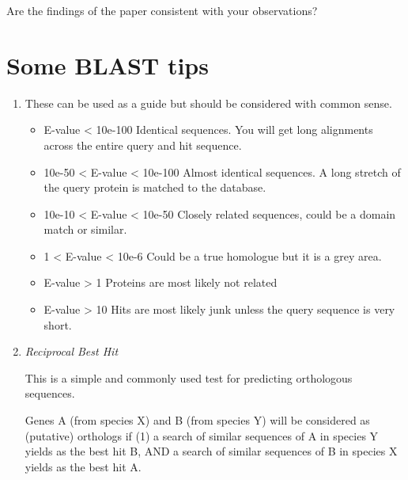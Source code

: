 \documentclass[a4paper,11pt]{article}
\begin{document}
Are the findings of the paper consistent with your observations?

\section{Some BLAST tips}

\begin{enumerate}
\item These can be used as a guide but should be considered with common sense. 

\begin{itemize}
\item E-value < 10e-100 Identical sequences. You will get long alignments across the entire query and hit sequence. 
\item 10e-50 < E-value < 10e-100 Almost identical sequences. A long stretch of the query protein is matched to the database. 
\item 10e-10 < E-value < 10e-50 Closely related sequences, could be a domain match or similar. 
\item 1 < E-value < 10e-6 Could be a true homologue but it is a grey area. 
\item E-value > 1 Proteins are most likely not related 
\item E-value > 10 Hits are most likely junk unless the query sequence is very short. 
\end{itemize}

\item \emph{Reciprocal Best Hit}

This is a simple and commonly used test for predicting orthologous sequences.

Genes A (from species X) and B (from species Y) will be considered as (putative) orthologs if (1) a search of similar sequences of A in species Y yields as the best hit B, AND a search of similar sequences of B in species X yields as the best hit A.
\end{enumerate}
\end{document}

